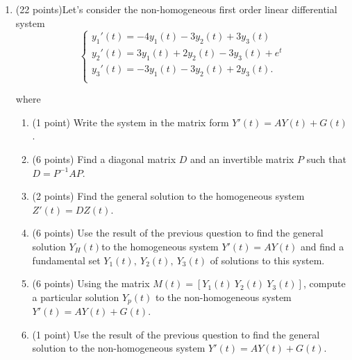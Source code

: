 \documentclass[11pt]{article}
\begin{document}
\thispagestyle{garde}
\vskip 1cm

\begin{enumerate}


\item (22 points)Let's consider the non-homogeneous first order linear differential system
\begin{equation*}
  \left\{
        \begin{array}{l}
       y_1'(t)=-4y_1(t)-3y_2(t)+3y_3(t)\\
       y_2'(t)=3y_1(t)+2y_2(t)-3y_3(t)+e^t\\
       y_3'(t)=-3y_1(t)-3y_2(t)+2y_3(t).\\
        \end{array}
    \right.
\end{equation*}


where 

\begin{enumerate}
\item (1 point) Write the system in the matrix form $Y'(t)= AY(t)+G(t)$.
\item (6 points) Find a diagonal matrix $D$ and an invertible matrix $P$ such that $D=P^{-1}AP$.
\item (2 points) Find the general solution to the homogeneous system $Z'(t)=DZ(t)$.
\item (6 points) Use the result of the previous question to find the general solution $Y_H(t)$to the homogeneous system $Y'(t)=AY(t)$ and find a fundamental set $Y_1(t),\ Y_2(t),\ Y_3(t)$ of solutions to this system.
\item (6 points) Using the matrix $M(t)=[Y_1(t) \ Y_2(t) \ Y_3(t)]$, compute a particular solution $Y_p(t)$ to the non-homogeneous system $Y'(t)= AY(t) + G(t)$.
\item (1 point) Use the result of the previous question to find the general solution to the non-homogeneous system $Y'(t)= AY(t) + G(t)$.   
\end{enumerate}


\end{enumerate}
\end{document}
